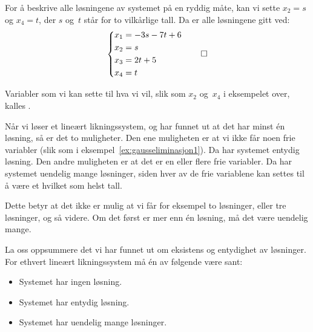 \begin{ex}
For å beskrive alle løsningene av systemet på en ryddig måte, kan vi
sette $x_2 = s$ og $x_4 = t$, der $s$ og~$t$ står for to vilkårlige
tall.  Da er alle løsningene gitt ved:
\[
\left\{
\begin{aligned}
x_1 &= -3 s - 7 t + 6 \\
x_2 &= s \\
x_3 &= 2 t + 5 \\
x_4 &= t
\end{aligned}
\right.
\qedhere
\]
\end{ex}

Variabler som vi kan sette til hva vi vil, slik som $x_2$ og~$x_4$ i
eksempelet over, kalles .

Når vi løser et lineært likningssystem, og har funnet ut at det har
minst én løsning, så er det to muligheter.  Den ene muligheten er at
vi ikke får noen frie variabler (slik som i
eksempel~\ref{ex:gausseliminasjon1}).  Da har systemet entydig
løsning.  Den andre muligheten er at det er en eller flere frie
variabler.  Da har systemet uendelig mange løsninger, siden hver av de
frie variablene kan settes til å være et hvilket som helst tall.

Dette betyr at det ikke er mulig at vi får for eksempel to løsninger,
eller tre løsninger, og så videre.  Om det først er mer enn én
løsning, må det være uendelig mange.

\medskip

La oss oppsummere det vi har funnet ut om eksistens og entydighet av
løsninger.  For ethvert lineært likningssystem må én av følgende være
sant:
\begin{itemize}
\item Systemet har ingen løsning.
\item Systemet har entydig løsning.
\item Systemet har uendelig mange løsninger.
\end{itemize}


